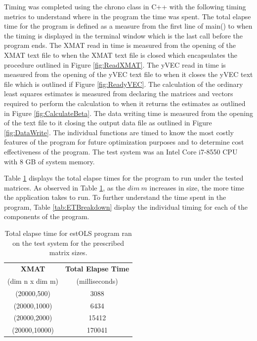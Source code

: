 \documentclass{article}
\begin{document}
Timing was completed using the chrono class in C++ with the following timing metrics to understand where in the program the time was spent. The total elapse time for the program is defined as a measure from the first line of main() to when the timing is displayed in the terminal window which is the last call before the program ends. The XMAT read in time is measured from the opening of the XMAT text file to when the XMAT text file is closed which encapsulates the procedure outlined in Figure \ref{fig:ReadXMAT}. The yVEC read in time is measured from the opening of the yVEC text file to when it closes the yVEC text file which is outlined if Figure \ref{fig:ReadyVEC}. The calculation of the ordinary least squares estimates is measured from declaring the matrices and vectors required to perform the calculation to when it returns the estimates as outlined in Figure \ref{fig:CalculateBeta}. The data writing time is measured from the opening of the text file to it closing the output data file as outlined in Figure \ref{fig:DataWrite}. The individual functions are timed to know the most costly features of the program for future optimization purposes and to determine cost effectiveness of the program. The test system was an Intel Core i7-8550 CPU with 8 GB of system memory.

Table \ref{tab:ET} displays the total elapse times for the program to run under the tested matrices. As observed in Table \ref{tab:ET}, as the $dim \ m$ increases in size, the more time the application takes to run. To further understand the time spent in the program, Table \ref{tab:ETBreakdown} display the individual timing for each of the components of the program. 

\begin{table}[H]
	\centering
	\begin{tabular}{ |c||c|} 
		\hline
		\textbf{XMAT} & \textbf{Total Elapse Time} \\ 
		(dim n x dim m) & (milliseconds)\\
		\hline
		\hline
		(20000,500) & 3088 \\ 
		\hline
		(20000,1000) & 6434 \\ 
		\hline
		(20000,2000) & 15412 \\ 
		\hline
		(20000,10000) & 170041 \\ 
		\hline
	\end{tabular}
	\caption{Total elapse time for estOLS program ran on the test system for the prescribed matrix sizes.} \label{tab:ET}
\end{table}
\end{document}
